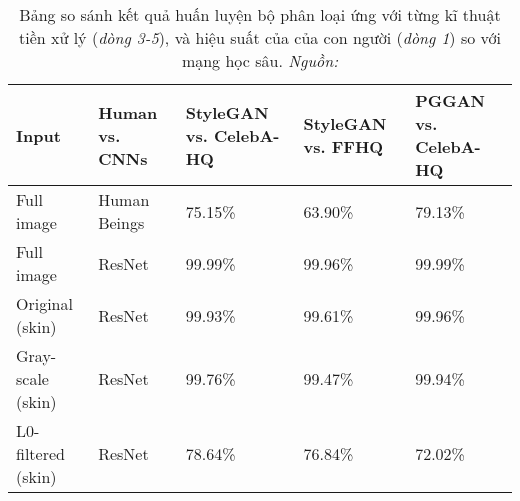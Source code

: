 \begin{center}
\begin{table}[htbp]
	\centering
	\begin{tabular}{p{3cm}|p{3cm}|p{2.5cm}|p{2cm}|p{2cm}}
		\hline
		\multirow{2}{*}{Input} & \multirow{2}{*}{Human vs. CNNs} & {StyleGAN vs. CelebA-HQ} & {StyleGAN vs. FFHQ} & {PGGAN vs. CelebA-HQ} \\ 
		\hline
		{Full image} & {Human Beings} & 75.15\% & 63.90\% & 79.13\% \\ 
		{Full image} & {ResNet} & 99.99\% & 99.96\% & 99.99\% \\ 
		\hdashline
		{Original (skin)} & {ResNet} & 99.93\% & 99.61\% & 99.96\% \\ 
		{Gray-scale (skin)} & {ResNet} & 99.76\% & 99.47\% & 99.94\% \\ 
		{L0-filtered (skin)} & {ResNet} & 78.64\% & 76.84\% & 72.02\% \\ 
		\hline
	\end{tabular}
	\caption{Bảng so sánh kết quả huấn luyện bộ phân loại ứng với từng kĩ thuật tiền xử lý (\textit{dòng 3-5}), và hiệu suất của của con người (\textit{dòng 1}) so với mạng học sâu. \textit{Nguồn:\cite{9157447}}}
	\label{tab:human_vs_cnns_1}
\end{table}
\end{center}